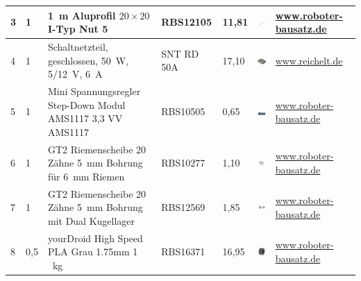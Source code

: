 \begin{center}
\begin{tabularx}{\linewidth}{|p{0.4cm}|p{0.4cm}|X|X|p{1cm}|X|X|}
		3 & 1 & 1\ m Aluprofil $20 \times 20$ I-Typ Nut 5 & RBS12105 & 11,81  & \includegraphics[width=2cm]{Images/Material/aluprofil.jpg} & \href{https://www.roboter-bausatz.de/p/1-meter-aluprofil-20x20-i-typ-nut-5}{www.roboter-bausatz.de} \\ 
		\hline
		4 & 1 & Schaltnetzteil, geschlossen, 50\ W, 5/12\ V, 6\ A & SNT RD 50A
		& 17,10   & \includegraphics[width=2cm]{Images/Material/RD50.png} & \href{https://www.reichelt.de/sg/de/schaltnetzteil-geschlossen-50-w-5-12-v-6-a-snt-rd-50a-p137098.html}{www.reichelt.de} \\ 
		\hline
		5 & 1 & Mini Spannungsregler Step-Down Modul AMS1117 3,3 VV AMS1117
		& RBS10505 & 0,65   & \includegraphics[width=2cm]{Images/Material/ams1117.jpg} & \href{https://www.roboter-bausatz.de/p/mini-spannungsregler-step-down-modul-ams1117-3-3-v}{www.roboter-bausatz.de} \\ 
		\hline
		6 & 1 & GT2 Riemenscheibe 20 Zähne 5\ mm Bohrung für 6\ mm Riemen & RBS10277 & 1,10  & \includegraphics[width=2cm]{Images/Material/RBS10277.jpg} & \href{https://www.roboter-bausatz.de/p/gt2-riemenscheibe-20-zaehne-5mm-bohrung-fuer-6mm-riemen}{www.roboter-bausatz.de} \\ 
		\hline
		7 & 1 & GT2 Riemenscheibe 20 Zähne 5\ mm Bohrung mit Dual Kugellager & RBS12569 & 1,85   & \includegraphics[width=2cm]{Images/Material/RBS12569.jpg} &	\href{https://www.roboter-bausatz.de/p/gt2-riemenscheibe-20-zaehne-5mm-bohrung-mit-dual-kugellager}{www.roboter-bausatz.de} \\ 
		\hline
		8 & 0,5 &yourDroid High Speed PLA Grau 1.75mm 1 \ kg  & RBS16371 & 16,95   & \includegraphics[width=2cm]{Images/Material/RBS16371.jpg} & \href{https://www.roboter-bausatz.de/p/yourdroid-high-speed-pla-grau-1.75mm-1kg}{www.roboter-bausatz.de} \\ 
		\hline		
				\end{tabularx}
		

\end{center}

